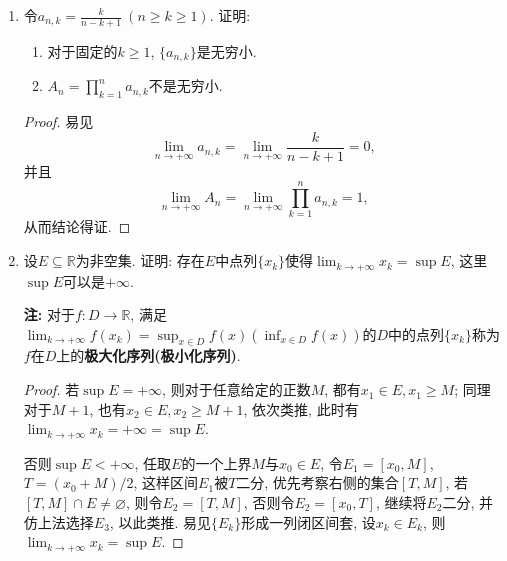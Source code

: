 \begin{2a}
\begin{enumerate}
\begin{proof}[解答]
由题设\[G_n=\sqrt[n]{\prod_{k=0}^{n-1}\left(a+kd\right)},
\quad A_n=\frac{\displaystyle\sum_{k=0}^{n-1}\left(a+kd\right)}{n}=a+\frac{n-1}{2},\] 
记\(t=\frac{a}{d}\). 于是
\[\begin{aligned}
\lim_{n\rightarrow+\infty}\frac{G_n}{A_n}
&=\lim_{n\rightarrow+\infty}\frac{\sqrt[n]{\displaystyle\prod_{k=0}^{n-1}\left(a+kd\right)}}{(n-1)d/2}\cdot\frac{(n-1)d/2}{a+(n-1)d/2}\\
&=\lim_{n\rightarrow+\infty}\sqrt[n]{\prod_{k=0}^{n-1}(t+k)}\cdot\frac{2}{n-1}\\
&=\lim_{n\rightarrow+\infty}\sqrt[n]{\frac{\Gamma(t+n)}{\Gamma(t)}}\cdot\frac{2}{n-1}\\
&=\lim_{n\rightarrow+\infty}\sqrt[n]{\frac{1}{\Gamma(t)}}\sqrt[n]{\left(\frac{t+n}{e}\right)^n\sqrt{2\pi(t+n)}}\cdot\frac{2}{n-1}\\
&=\lim_{n\rightarrow+\infty}\frac{t+n}{e}\frac{2}{n+1}=\frac{2}{e}.
\end{aligned}\]
\end{proof}
\item 令\(a_{n,k}=\frac{k}{n-k+1}\ (n\geqslant k\geqslant 1)\). 证明:
\begin{enumerate}[label=(\arabic*)]
\item 对于固定的\(k\geqslant 1\), \(\{a_{n,k}\}\)是无穷小.
\item \( A_n=\prod_{k=1}^{n}a_{n,k}\)不是无穷小.
\end{enumerate}
\begin{proof}
易见\[\lim_{n\rightarrow+\infty}a_{n,k}=\lim_{n\rightarrow+\infty}\frac{k}{n-k+1}=0,\]
并且\[\lim_{n\rightarrow+\infty}A_n=\lim_{n\rightarrow+\infty}\prod_{k=1}^{n}a_{n,k}=1,\]
从而结论得证.
\end{proof}
\item 设\(E\subseteq\mathbb{R}\)为非空集. 
证明: 存在\(E\)中点列\(\{x_k\}\)使得\(\lim_{k\rightarrow+\infty}x_k=\sup E\), 
这里\(\sup E\)可以是\(+\infty\).

\textbf{注: }对于\(f:D\rightarrow\mathbb{R}\), 
满足\(\lim_{k\rightarrow+\infty}f(x_k)=\sup_{x\in D}f(x)\left(\inf_{x\in D}f(x)\right)\)的\(D\)中的点列\(\{x_k\}\)称为\(f\)在\(D\)上的\textbf{极大化序列(极小化序列)}.
\begin{proof}
若\(\sup E=+\infty\), 则对于任意给定的正数\(M\), 都有\(x_1\in E, x_1\geqslant M\); 
同理对于\(M+1\), 也有\(x_2\in E, x_2\geqslant M+1\), 
依次类推, 此时有\(\lim_{k\rightarrow+\infty}x_k=+\infty=\sup E\).

否则\(\sup E<+\infty\), 任取\(E\)的一个上界\(M\)与\(x_0\in E\), 
令\(E_1=[x_0,M]\), \(T=(x_0+M)/2\), 这样区间\(E_1\)被\(T\)二分, 
优先考察右侧的集合\([T,M]\), 若\([T,M]\cap E\ne\varnothing\), 
则令\(E_2=[T,M]\), 否则令\(E_2=[x_0,T]\), 
继续将\(E_2\)二分, 并仿上法选择\(E_3\), 以此类推. 
易见\(\{E_k\}\)形成一列闭区间套, 设\(x_k\in E_k\), 
则\(\lim_{k\rightarrow+\infty}x_k=\sup E\).
\end{proof}
\end{enumerate}
\end{2a}
